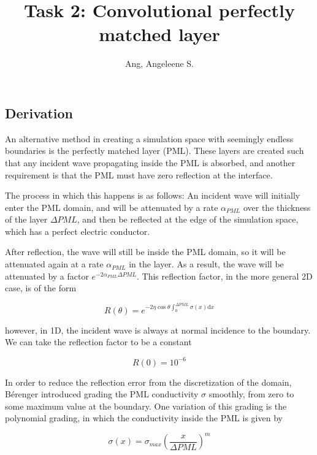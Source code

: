 \documentclass{article}
\title{Task 2: Convolutional perfectly matched
layer}
\author{Ang, Angeleene S.}
\begin{document}
    
    
    \maketitle
    
    

    
    \subsection*{Derivation}\label{derivation}

An alternative method in creating a simulation space with seemingly
endless boundaries is the perfectly matched layer (PML). These layers
are created such that any incident wave propagating inside the PML is
absorbed, and another requirement is that the PML must have zero
reflection at the interface.

The process in which this happens is as follows: An incident wave will
initially enter the PML domain, and will be attenuated by a rate
\(\alpha_{PML}\) over the thickness of the layer \(\Delta PML\), and
then be reflected at the edge of the simulation space, which has a
perfect electric conductor.

After reflection, the wave will still be inside the PML domain, so it
will be attenuated again at a rate \(\alpha_{PML}\) in the layer. As a
result, the wave will be attenuated by a factor
\(e^{-2 \alpha_{PML} \Delta PML}\). This reflection factor, in the more
general 2D case, is of the form

\begin{equation}
R(\theta) = e^{-2 \eta \cos \theta \int_{0}^{\Delta PML} \sigma(x) \mathrm{d} x }
\end{equation}

however, in 1D, the incident wave is always at normal incidence to the
boundary. We can take the reflection factor to be a constant

\begin{equation}
R(0) = 10^{-6}
\end{equation}

    In order to reduce the reflection error from the discretization of the
domain, Bérenger introduced grading the PML conductivity \(\sigma\)
smoothly, from zero to some maximum value at the boundary. One variation
of this grading is the polynomial grading, in which the conductivity
inside the PML is given by

\begin{equation}
\sigma(x) = \sigma_{max} \left( \dfrac{x}{\Delta PML} \right)^m 
\end{equation}
\end{document}
